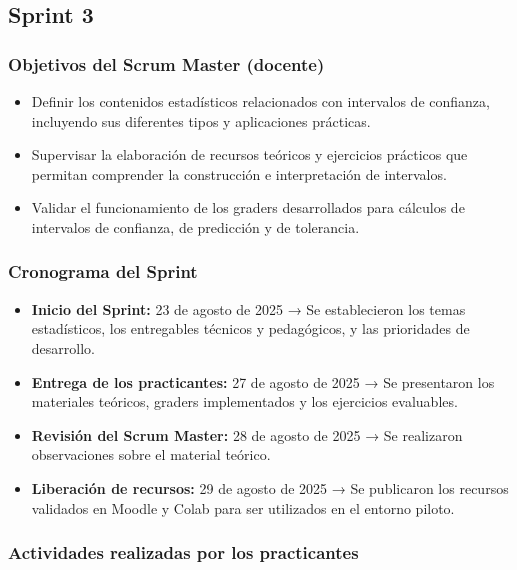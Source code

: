 \documentclass[letter,oneside,12pt,spanish]{report}
\begin{document}
\subsection{Sprint 3}

\subsubsection*{Objetivos del Scrum Master (docente)}
\begin{itemize}
	\item Definir los contenidos estadísticos relacionados con intervalos de confianza, incluyendo sus diferentes tipos y aplicaciones prácticas.
	\item Supervisar la elaboración de recursos teóricos y ejercicios prácticos que permitan comprender la construcción e interpretación de intervalos.
	\item Validar el funcionamiento de los graders desarrollados para cálculos de intervalos de confianza, de predicción y de tolerancia.
\end{itemize}

\subsubsection*{Cronograma del Sprint}
\begin{itemize}
	\item \textbf{Inicio del Sprint:} 23 de agosto de 2025 → Se establecieron los temas estadísticos, los entregables técnicos y pedagógicos, y las prioridades de desarrollo.
	\item \textbf{Entrega de los practicantes:} 27 de agosto de 2025 → Se presentaron los materiales teóricos, graders implementados y los ejercicios evaluables.
	\item \textbf{Revisión del Scrum Master:} 28 de agosto de 2025 → Se realizaron observaciones sobre el material teórico.
	\item \textbf{Liberación de recursos:} 29 de agosto de 2025 → Se publicaron los recursos validados en Moodle y Colab para ser utilizados en el entorno piloto.
\end{itemize}

\subsubsection*{Actividades realizadas por los practicantes}
\end{document}
